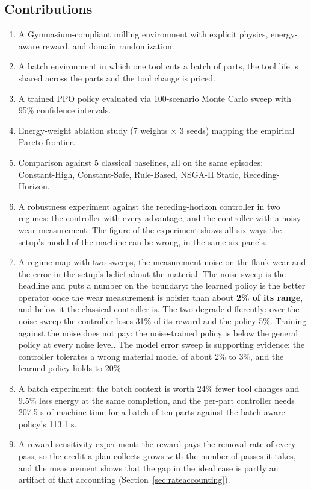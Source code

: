 \documentclass[11pt,a4paper]{article}
\newcommand{\alert}[1]{\textcolor{IITGold}{\textbf{#1}}}
\begin{document}
\subsection{Contributions}
\begin{enumerate}
    \item A Gymnasium-compliant milling environment with explicit physics, energy-aware reward, and domain randomization.
    \item A batch environment in which one tool cuts a batch of parts, the tool life is shared across the parts and the tool change is priced.
    \item A trained PPO policy evaluated via 100-scenario Monte Carlo sweep with 95\% confidence intervals.
    \item Energy-weight ablation study (7 weights $\times$ 3 seeds) mapping the empirical Pareto frontier.
    \item Comparison against 5 classical baselines, all on the same episodes:\\
    Constant-High, Constant-Safe, Rule-Based, NSGA-II Static, Receding-Horizon.
    \item A robustness experiment against the receding-horizon controller in two regimes: the controller with every advantage, and the controller with a noisy wear measurement. The figure of the experiment shows all six ways the setup's model of the machine can be wrong, in the same six panels.
    \item A regime map with two sweeps, the measurement noise on the flank wear and the error in the setup's belief about the material. The noise sweep is the headline and puts a number on the boundary: the learned policy is the better operator once the wear measurement is noisier than about \alert{2\% of its range}, and below it the classical controller is. The two degrade differently: over the noise sweep the controller loses 31\% of its reward and the policy 5\%. Training against the noise does not pay: the noise-trained policy is below the general policy at every noise level. The model error sweep is supporting evidence: the controller tolerates a wrong material model of about 2\% to 3\%, and the learned policy holds to 20\%.
    \item A batch experiment: the batch context is worth 24\% fewer tool changes and 9.5\% less energy at the same completion, and the per-part controller needs 207.5 s of machine time for a batch of ten parts against the batch-aware policy's 113.1 s.
    \item A reward sensitivity experiment: the reward pays the removal rate of every pass, so the credit a plan collects grows with the number of passes it takes, and the measurement shows that the gap in the ideal case is partly an artifact of that accounting (Section~\ref{sec:rateaccounting}).

\end{enumerate}
\end{document}

